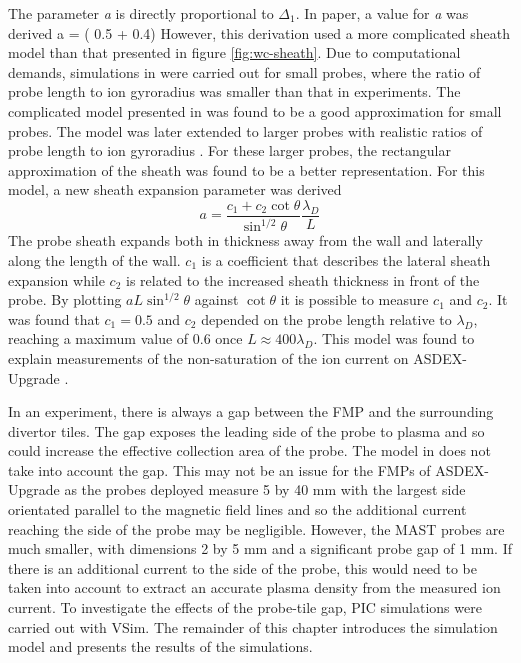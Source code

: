 \ee
The parameter \textit{a} is directly proportional to $\Delta_1$. In \cite{bergmann_1994} paper, a value for \textit{a} was derived 
\be 
a = \left( 0.5 + 0.4\right) 
\ee
However, this derivation used a more complicated sheath model than that presented in figure \ref{fig:wc-sheath}. Due to computational demands, simulations in \cite{bergmann_1994} were carried out for small probes, where the ratio of probe length to ion gyroradius was smaller than that in experiments. The complicated model presented in \cite{bergmann_1994} was found to be a good approximation for small probes. The model was later extended to larger probes with realistic ratios of probe length to ion gyroradius \cite{Bergmann-2002}.  For these larger probes, the rectangular approximation of the sheath was found to be a better representation. For this model, a new sheath expansion parameter was derived
\begin{equation}
a = \frac{c_1 + c_2 \cot{\theta}}{{\sin^{1/2}{\theta}}} \frac{\lambda_D}{L}
\label{eq:sheath_expansion}
\end{equation}
The probe sheath expands both in thickness away from the wall and laterally along the length of the wall. $c_1$ is a coefficient that describes the lateral sheath expansion while $c_2$ is related to the increased sheath thickness in front of the probe. By plotting $a L \sin^{1/2}{\theta}$ against $\cot {\theta}$ it is possible to measure $c_1$ and $c_2$. It was found that $c_1 =0.5$ and $c_2$ depended on the probe length relative to $\lambda_D$, reaching a maximum value of 0.6 once $L \approx 400 \lambda_D$. This model was found to explain measurements of the non-saturation of the ion current on ASDEX-Upgrade \cite{Bergmann-2002}.

In an experiment, there is always a gap between the FMP and the surrounding divertor tiles. The gap exposes the leading side of the probe to plasma and so could increase the effective collection area of the probe. The model in \cite{Bergmann-2002} does not take into account the gap. This may not be an issue for the FMPs of ASDEX-Upgrade as the probes deployed measure 5 by 40 mm with the largest side orientated parallel to the magnetic field lines \cite{asdex_FMP} and so the additional current reaching the side of the probe may be negligible. However, the MAST probes are much smaller, with dimensions 2 by 5 mm and a significant probe gap of 1 mm. If there is an additional current to the side of the probe, this would need to be taken into account to extract an accurate plasma density from the measured ion current. To investigate the effects of the probe-tile gap, PIC simulations were carried out with VSim. The remainder of this chapter introduces the simulation model and presents the results of the simulations. 


